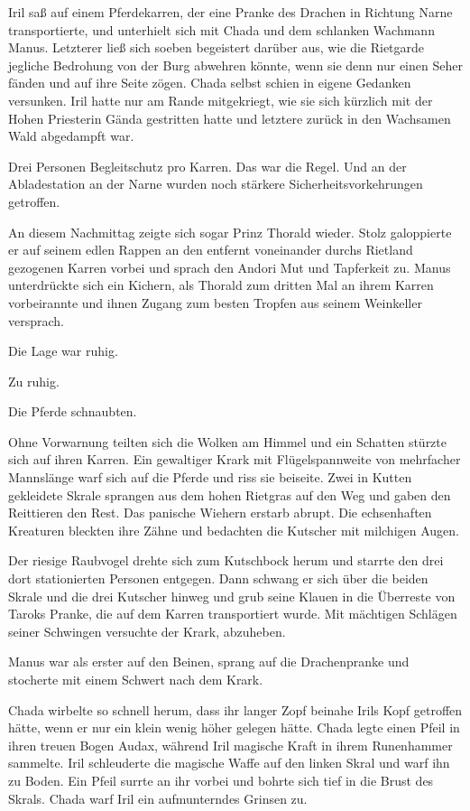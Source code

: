 Iril saß auf einem Pferdekarren, der eine Pranke des Drachen in Richtung Narne transportierte, und unterhielt sich mit Chada und dem schlanken Wachmann Manus. Letzterer ließ sich soeben begeistert darüber aus, wie die Rietgarde jegliche Bedrohung von der Burg abwehren könnte, wenn sie denn nur einen Seher fänden und auf ihre Seite zögen. Chada selbst schien in eigene Gedanken versunken. Iril hatte nur am Rande mitgekriegt, wie sie sich kürzlich mit der Hohen Priesterin Gända gestritten hatte und letztere zurück in den Wachsamen Wald abgedampft war.

Drei Personen Begleitschutz pro Karren. Das war die Regel. Und an der Abladestation an der Narne wurden noch stärkere Sicherheitsvorkehrungen getroffen.

An diesem Nachmittag zeigte sich sogar Prinz Thorald wieder. Stolz galoppierte er auf seinem edlen Rappen an den entfernt voneinander durchs Rietland gezogenen Karren vorbei und sprach den Andori Mut und Tapferkeit zu. Manus unterdrückte sich ein Kichern, als Thorald zum dritten Mal an ihrem Karren vorbeirannte und ihnen Zugang zum besten Tropfen aus seinem Weinkeller versprach.

Die Lage war ruhig.

Zu ruhig.

Die Pferde schnaubten.

Ohne Vorwarnung teilten sich die Wolken am Himmel und ein Schatten stürzte sich auf ihren Karren. Ein gewaltiger Krark mit Flügelspannweite von mehrfacher Mannslänge warf sich auf die Pferde und riss sie beiseite. Zwei in Kutten gekleidete Skrale sprangen aus dem hohen Rietgras auf den Weg und gaben den Reittieren den Rest. Das panische Wiehern erstarb abrupt. Die echsenhaften Kreaturen bleckten ihre Zähne und bedachten die Kutscher mit milchigen Augen.

Der riesige Raubvogel drehte sich zum Kutschbock herum und starrte den drei dort stationierten Personen entgegen. Dann schwang er sich über die beiden Skrale und die drei Kutscher hinweg und grub seine Klauen in die Überreste von Taroks Pranke, die auf dem Karren transportiert wurde. Mit mächtigen Schlägen seiner Schwingen versuchte der Krark, abzuheben.

Manus war als erster auf den Beinen, sprang auf die Drachenpranke und stocherte mit einem Schwert nach dem Krark.

Chada wirbelte so schnell herum, dass ihr langer Zopf beinahe Irils Kopf getroffen hätte, wenn er nur ein klein wenig höher gelegen hätte. Chada legte einen Pfeil in ihren treuen Bogen Audax, während Iril magische Kraft in ihrem Runenhammer sammelte. Iril schleuderte die magische Waffe auf den linken Skral und warf ihn zu Boden. Ein Pfeil surrte an ihr vorbei und bohrte sich tief in die Brust des Skrals. Chada warf Iril ein aufmunterndes Grinsen zu.


